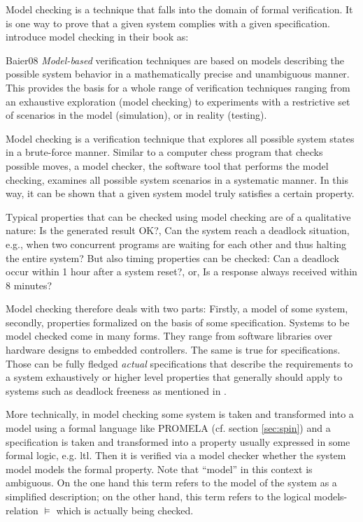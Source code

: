 Model checking is a technique that falls into the domain of formal verification.
It is one way to prove that a given system complies with a given specification.
\citeauthor{Baier08} introduce model checking in their book  \cite{Baier08} as:
\begin{displaycquote}[p.7ff.]{Baier08}
    \textit{Model-based} verification techniques are based on models describing the possible system behavior in a mathematically precise and unambiguous manner. \textelp{}
    This provides the basis for a whole range of verification techniques ranging from an exhaustive exploration (model checking) to experiments with a restrictive set of scenarios in the model (simulation), or in reality (testing). \textelp{}

    Model checking is a verification technique that explores all possible system states in a brute-force manner.
    Similar to a computer chess program that checks possible moves, a model checker, the software tool that performs the model checking, examines all possible system scenarios in a systematic manner.
    In this way, it can be shown that a given system model truly satisfies a certain property. \textelp{}

    Typical properties that can be checked using model checking are of a qualitative nature:
    Is the generated result OK?,
    Can the system reach a deadlock situation, e.g., when two concurrent programs are waiting for each other and thus halting the entire system?
    But also timing properties can be checked:
    Can a deadlock occur within 1 hour after a system reset?, or, Is a response always received within 8 minutes?
\end{displaycquote}

Model checking therefore deals with two parts: Firstly, a model of some system, secondly, properties formalized on the basis of some specification.
Systems to be model checked come in many forms.
They range from software libraries over hardware designs to embedded controllers.
The same is true for specifications.
Those can be fully fledged \textit{actual} specifications that describe the requirements to a system exhaustively or higher level properties that generally should apply to systems such as deadlock freeness as mentioned in \cite{Baier08}.

More technically, in model checking some system is taken and transformed into a model using a formal language like PROMELA (cf. section \ref{sec:spin}) and a specification is taken and transformed into a property usually expressed in some formal logic, e.g. \gls{ltl}.
Then it is verified via a model checker whether the system model models the formal property.
Note that \enquote{model} in this context is ambiguous.
On the one hand this term refers to the model of the system as a simplified description; on the other hand, this term refers to the logical models-relation $ \models $ which is actually being checked.

